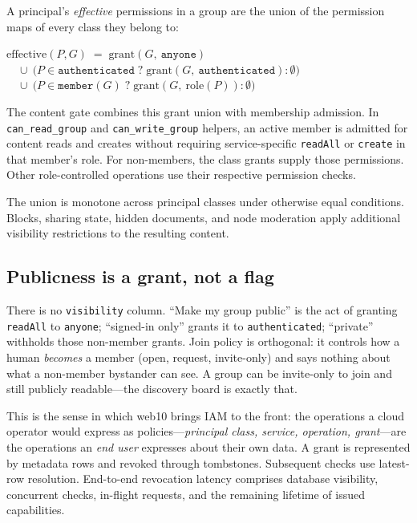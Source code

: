 \documentclass[sigconf, nonacm]{acmart}
\begin{document}
A principal's \emph{effective} permissions in a group are the union of the
permission maps of every class they belong to:

\begin{center}
\small
$\mathrm{effective}(P, G) \;=\; \mathrm{grant}(G,\ \texttt{anyone})$\\
$\quad \cup\ \big(P \in \texttt{authenticated} \;?\; \mathrm{grant}(G,\ \texttt{authenticated}) : \emptyset\big)$\\
$\quad \cup\ \big(P \in \texttt{member}(G) \;?\; \mathrm{grant}(G,\ \mathrm{role}(P)) : \emptyset\big)$
\end{center}

The content gate combines this grant union with membership admission. In
\texttt{can\_read\_group} and
\texttt{can\_write\_group} helpers, an active member is admitted for content
reads and creates without requiring service-specific \texttt{readAll} or
\texttt{create} in that member's role. For non-members, the class grants supply
those permissions. Other role-controlled operations use their respective
permission checks.

The union is monotone across principal classes under otherwise equal
conditions. Blocks, sharing state, hidden documents, and node moderation apply
additional visibility restrictions to the resulting content.

\subsection{Publicness is a grant, not a flag}

There is no \texttt{visibility} column. ``Make my group public'' is the act
of granting \texttt{readAll} to \texttt{anyone}; ``signed-in only'' grants it
to \texttt{authenticated}; ``private'' withholds those non-member grants. Join
policy is orthogonal: it controls how a human \emph{becomes} a member (open,
request, invite-only) and says nothing about what a non-member bystander can
see. A group can be invite-only to join and still publicly readable---the
discovery board is exactly that.

This is the sense in which web10 brings IAM to the front: the operations a
cloud operator would express as policies---\emph{principal class, service,
operation, grant}---are the operations an \emph{end user} expresses about
their own data. A grant is represented by metadata rows and revoked through
tombstones. Subsequent checks use latest-row resolution. End-to-end revocation
latency comprises database visibility, concurrent checks, in-flight requests,
and the remaining lifetime of issued capabilities.
\end{document}
